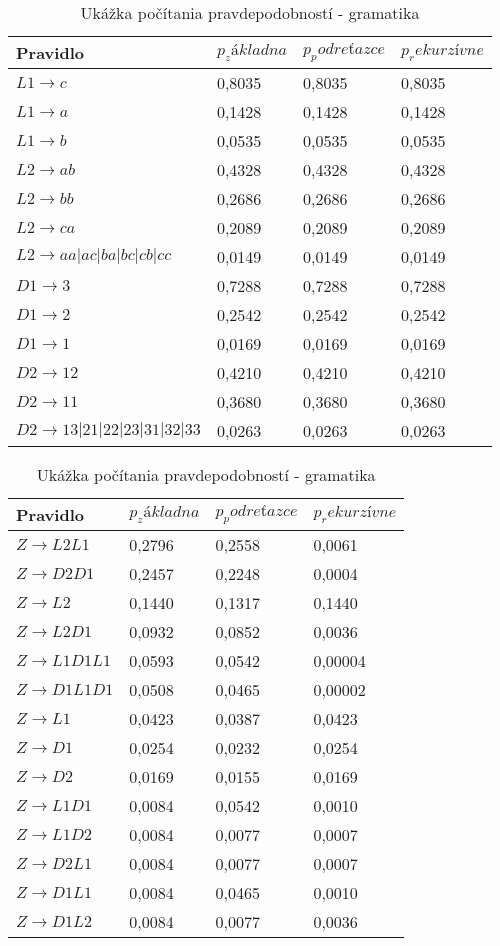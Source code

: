 \begin{table}[]
\centering
\caption{Ukážka počítania pravdepodobností - gramatika}
\label{gramatikaPP}
\begin{tabular}{l|lll}
Pravidlo & \(p_základna\) & \(p_podreťazce\) & \(p_rekurzívne\) \\ \hline
\(L1 \to c\) & 0,8035 & 0,8035 & 0,8035 \\
\(L1 \to a\) & 0,1428 & 0,1428 & 0,1428 \\
\(L1 \to b\) & 0,0535 & 0,0535 & 0,0535 \\
\(L2 \to ab\) & 0,4328 & 0,4328 & 0,4328 \\
\(L2 \to bb\) & 0,2686 & 0,2686 & 0,2686 \\
\(L2 \to ca\) & 0,2089 & 0,2089 & 0,2089 \\
\(L2 \to aa|ac|ba|bc|cb|cc\) & 0,0149 & 0,0149 & 0,0149 \\
\(D1 \to 3\) & 0,7288 & 0,7288 & 0,7288 \\
\(D1 \to 2\) & 0,2542 & 0,2542 & 0,2542 \\
\(D1 \to 1\) & 0,0169 & 0,0169 & 0,0169 \\
\(D2 \to 12\) & 0,4210 & 0,4210 & 0,4210 \\
\(D2 \to 11\) & 0,3680 & 0,3680 & 0,3680 \\
\(D2 \to 13|21|22|23|31|32|33\) & 0,0263 & 0,0263 & 0,0263 
\end{tabular}
\quad
\begin{tabular}{l|lll}
Pravidlo & \(p_základna\) & \(p_podreťazce\) & \(p_rekurzívne\) \\ \hline
\(Z \to L2L1\) & 0,2796 & 0,2558 & 0,0061 \\
\(Z \to D2D1\) & 0,2457 & 0,2248 & 0,0004 \\
\(Z \to L2\) & 0,1440 & 0,1317 & 0,1440 \\
\(Z \to L2D1\) & 0,0932 & 0,0852 & 0,0036 \\
\(Z \to L1D1L1\) & 0,0593 & 0,0542 & 0,00004 \\
\(Z \to D1L1D1\) & 0,0508 & 0,0465 & 0,00002 \\
\(Z \to L1\) & 0,0423 & 0,0387 & 0,0423 \\
\(Z \to D1\) & 0,0254 & 0,0232 & 0,0254 \\
\(Z \to D2\) & 0,0169 & 0,0155 & 0,0169 \\
\(Z \to L1D1\) & 0,0084 & 0,0542 & 0,0010 \\
\(Z \to L1D2\) & 0,0084 & 0,0077 & 0,0007 \\
\(Z \to D2L1\) & 0,0084 & 0,0077 & 0,0007 \\
\(Z \to D1L1\) & 0,0084 & 0,0465 & 0,0010 \\
\(Z \to D1L2\) & 0,0084 & 0,0077 & 0,0036 \\
\end{tabular}
\end{table}

